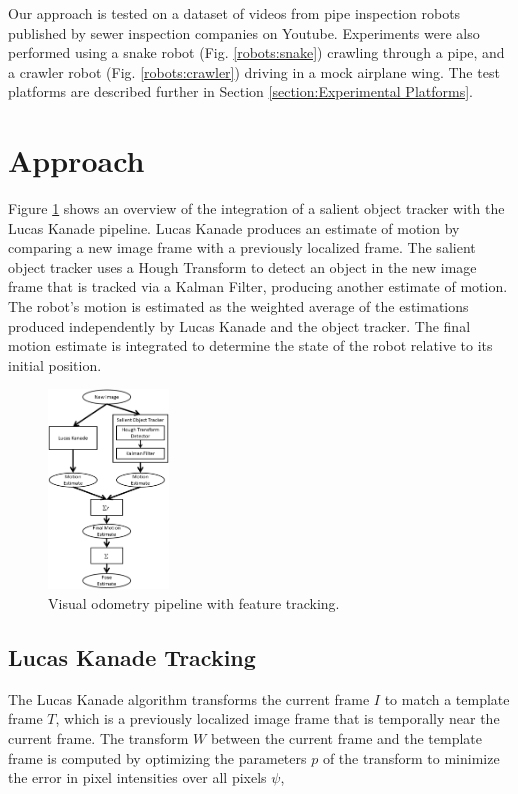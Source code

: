 \documentclass[letterpaper, 10 pt, conference]{ieeeconf}
\begin{document}
Our approach is tested on a dataset of videos from pipe inspection robots published by sewer inspection companies on Youtube. Experiments were also performed using a snake robot (Fig. \ref{robots:snake}) crawling through a pipe, and a crawler robot (Fig. \ref{robots:crawler}) driving in a mock airplane wing. The test platforms are described further in Section \ref{section:Experimental Platforms}.


\section{Approach}

Figure \ref{approach} shows an overview of the integration of a salient object tracker with the Lucas Kanade pipeline. Lucas Kanade produces an estimate of motion by comparing a new image frame with a previously localized frame. The salient object tracker uses a Hough Transform to detect an object in the new image frame that is tracked via a Kalman Filter, producing another estimate of motion. The robot's motion is estimated as the weighted average of the estimations produced independently by Lucas Kanade and the object tracker. The final motion estimate is integrated to determine the state of the robot relative to its initial position.

\begin{figure}[tb]
	\centering
	\includegraphics[height=200px]{approach_overview.png}
	\caption{Visual odometry pipeline with feature tracking.}
    \label{approach}
\end{figure}

\subsection{Lucas Kanade Tracking}

The Lucas Kanade algorithm transforms the current frame $I$ to match a template frame $T$, which is a previously localized image frame that is temporally near the current frame. The transform $W$ between the current frame and the template frame is computed by optimizing the parameters $p$ of the transform to minimize the error in pixel intensities over all pixels $\psi$,
\end{document}
